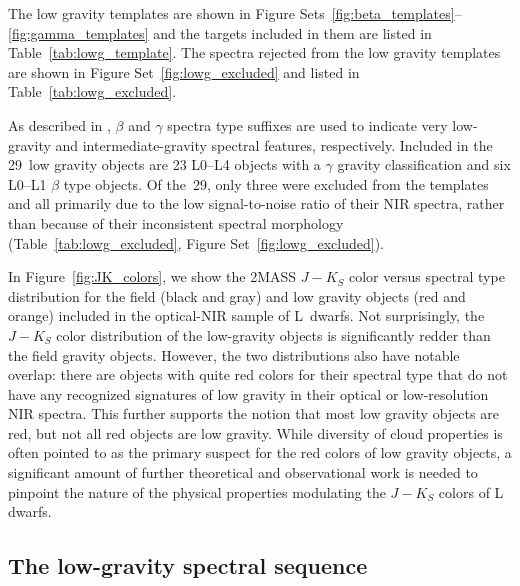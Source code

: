 \documentclass[12pt,preprint]{aastex}
\newcommand{\optLowG}{29}
\begin{document}
The low gravity templates are shown in Figure Sets~\ref{fig:beta_templates}--\ref{fig:gamma_templates} and the targets included in them are listed in Table~\ref{tab:lowg_template}.
The spectra rejected from the low gravity templates are shown in Figure Set~\ref{fig:lowg_excluded} and listed in Table~\ref{tab:lowg_excluded}.

As described in \cite{Cruz09_lowg}, $\beta$ and $\gamma$ spectra type suffixes are used to indicate very low-gravity and intermediate-gravity spectral features, respectively.
Included in the \optLowG~low gravity objects are 23 L0--L4 objects with a $\gamma$ gravity classification and six L0--L1 $\beta$ type objects.
Of the~\optLowG, only three were excluded from the templates and all primarily due to the low signal-to-noise ratio of their NIR spectra, rather than because of their inconsistent spectral morphology (Table~\ref{tab:lowg_excluded}, Figure Set~\ref{fig:lowg_excluded}).

In Figure~\ref{fig:JK_colors}, we show the 2MASS $J-K_S$ color versus spectral type distribution for the field (black and gray) and low gravity objects (red and orange) included in the optical-NIR sample of L~dwarfs.
Not surprisingly, the $J-K_S$ color distribution of the low-gravity objects is significantly redder than the field gravity objects. 
However, the two distributions also have notable overlap: there are objects with quite red colors for their spectral type that do not have any recognized signatures of low gravity in their optical or low-resolution NIR spectra.
This further supports the notion that most low gravity objects are red, but not all red objects are low gravity.
While diversity of cloud properties is often pointed to as the primary suspect for the red colors of low gravity objects, a significant amount of further theoretical and observational work is needed to pinpoint the nature of the physical properties modulating the $J-K_S$ colors of L dwarfs.

\subsection{The low-gravity spectral sequence}
\end{document}
